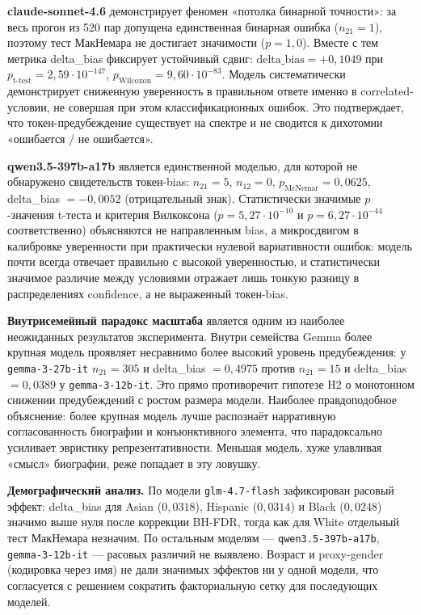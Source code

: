 \textbf{claude-sonnet-4.6} демонстрирует феномен «потолка бинарной точности»: за весь прогон из 520 пар допущена единственная бинарная ошибка ($n_{21} = 1$), поэтому тест МакНемара не достигает значимости ($p = 1{,}0$). Вместе с тем метрика delta\_bias фиксирует устойчивый сдвиг: $\text{delta\_bias} = +0{,}1049$ при $p_{\text{t-test}} = 2{,}59 \cdot 10^{-147}$, $p_{\text{Wilcoxon}} = 9{,}60 \cdot 10^{-83}$. Модель систематически демонстрирует сниженную уверенность в правильном ответе именно в correlated-условии, не совершая при этом классификационных ошибок. Это подтверждает, что токен-предубеждение существует на спектре и не сводится к дихотомии «ошибается / не ошибается».

\textbf{qwen3.5-397b-a17b} является единственной моделью, для которой не обнаружено свидетельств токен-bias: $n_{21} = 5$, $n_{12} = 0$, $p_{\text{McNemar}} = 0{,}0625$, delta\_bias $= -0{,}0052$ (отрицательный знак). Статистически значимые $p$-значения t-теста и критерия Вилкоксона ($p = 5{,}27 \cdot 10^{-10}$ и $p = 6{,}27 \cdot 10^{-44}$ соответственно) объясняются не направленным bias, а микросдвигом в калибровке уверенности при практически нулевой вариативности ошибок: модель почти всегда отвечает правильно с высокой уверенностью, и статистически значимое различие между условиями отражает лишь тонкую разницу в распределениях confidence, а не выраженный токен-bias.

\textbf{Внутрисемейный парадокс масштаба} является одним из наиболее неожиданных результатов эксперимента. Внутри семейства Gemma более крупная модель проявляет несравнимо более высокий уровень предубеждения: у \texttt{gemma-3-27b-it} $n_{21} = 305$ и delta\_bias $= 0{,}4975$ против $n_{21} = 15$ и delta\_bias $= 0{,}0389$ у \texttt{gemma-3-12b-it}. Это прямо противоречит гипотезе H2 о монотонном снижении предубеждений с ростом размера модели. Наиболее правдоподобное объяснение: более крупная модель лучше распознаёт нарративную согласованность биографии и конъюнктивного элемента, что парадоксально усиливает эвристику репрезентативности. Меньшая модель, хуже улавливая «смысл» биографии, реже попадает в эту ловушку.

\textbf{Демографический анализ.} По модели \texttt{glm-4.7-flash} зафиксирован расовый эффект: delta\_bias для Asian ($0{,}0318$), Hispanic ($0{,}0314$) и Black ($0{,}0248$) значимо выше нуля после коррекции BH-FDR, тогда как для White отдельный тест МакНемара незначим. По остальным моделям --- \texttt{qwen3.5-397b-a17b}, \texttt{gemma-3-12b-it} --- расовых различий не выявлено. Возраст и proxy-gender (кодировка через имя) не дали значимых эффектов ни у одной модели, что согласуется с решением сократить факториальную сетку для последующих моделей.

